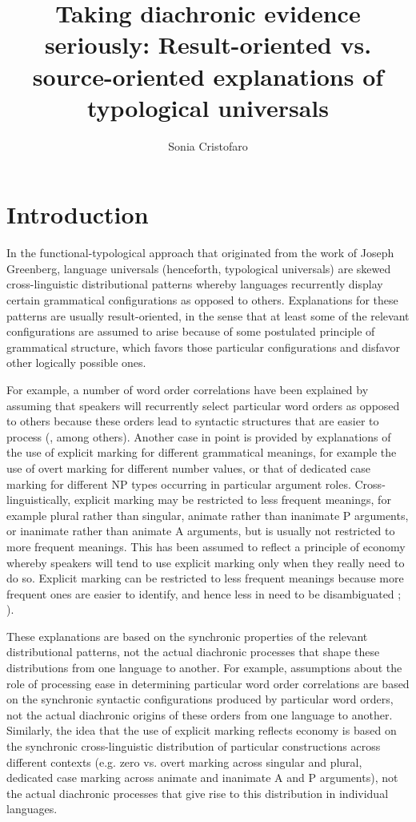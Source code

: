 \documentclass[output=paper]{langsci/langscibook}
\author{Sonia Cristofaro\affiliation{University of Pavia}}
\title{Taking diachronic evidence seriously: Result-oriented
  vs. source-oriented explanations of typological universals}
\begin{document}
\maketitle 
  
\label{p:cristofaro:evidenceseriously}
 

\section{Introduction}\label{intro}
In the functional-typological approach that originated from the work
of Joseph Greenberg, language universals (henceforth, typological
universals) are skewed cross-linguistic
  distributional patterns whereby languages recurrently display
  certain grammatical configurations as opposed to others. Explanations for these patterns are usually result-oriented, in the 
sense  that at least some of the relevant configurations are assumed
to arise because of some postulated principle of grammatical
structure, which favors those particular configurations and disfavor
other logically possible ones.

For example, a
  number of word order correlations have been explained by assuming that
speakers will recurrently select particular word orders as opposed
  to others because these orders lead to syntactic structures that are
  easier to process (\citealt{Hawkins2004},  among others). Another case in point is
  provided by explanations of the use of explicit marking for
  different grammatical meanings, for example the
  use of overt marking for different number values, or that of 
 dedicated case marking for different NP types
occurring in particular argument roles. Cross-linguistically, explicit
marking may be restricted to less frequent meanings, for example plural rather than singular, animate rather than
inanimate P arguments, or inanimate rather than animate A arguments, but
is usually not restricted to more frequent meanings. This has been assumed to reflect 
a principle of economy whereby
speakers will tend to use explicit marking only when they really need
to do so. Explicit marking can be restricted to less frequent meanings
because more frequent ones are easier to identify, and hence less in
need to be disambiguated
\citep{Greenberg1966,Corbett2000,TU2};
\citealt{Martinmarkedness,Haspelmath2008}). 

These explanations are based on the synchronic properties of the
relevant distributional patterns, not the actual diachronic processes
that shape these distributions from one language to another. For
example, assumptions about the role of
processing ease in determining particular word order correlations are based on the synchronic syntactic configurations
  produced by particular word orders, not the actual diachronic
  origins of these orders from one language to
  another. Similarly, the idea that the use of explicit marking reflects economy is based on
the synchronic cross-linguistic distribution of particular
constructions across different contexts (e.g. zero vs. overt marking
across singular and plural, dedicated case marking across animate and
inanimate A and P arguments), not the actual diachronic processes that give rise to this distribution in
individual languages. 
\end{document}
